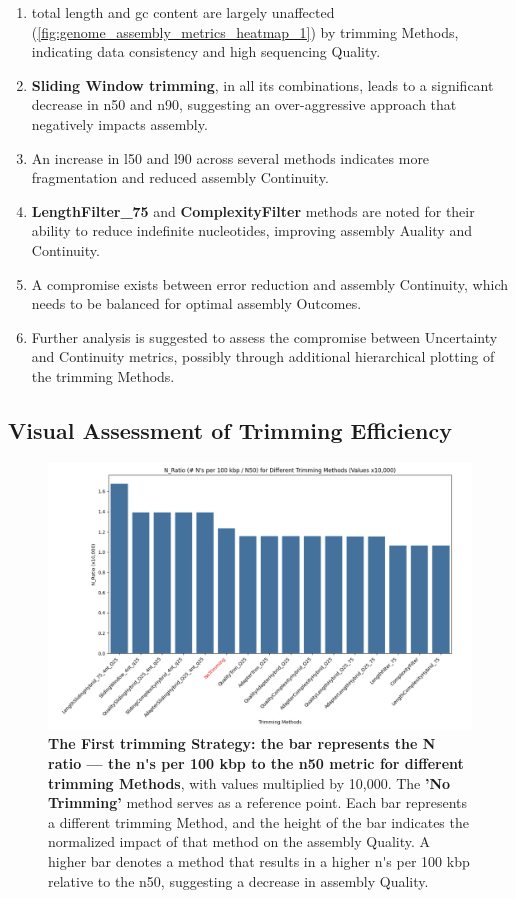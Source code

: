 \begin{enumerate}
  \item \gls{total length} and \gls{gc} content are largely unaffected (\autoref{fig:genome_assembly_metrics_heatmap_1}) by \gls{trimming} Methods, indicating data consistency and high \gls{sequencing} Quality.
  \item \textbf{Sliding Window \gls{trimming}}, in all its combinations, leads to a significant decrease in \gls{n50} and \gls{n90}, suggesting an over-aggressive approach that negatively impacts \gls{assembly}.
  \item An increase in \gls{l50} and \gls{l90} across several methods indicates more fragmentation and reduced \gls{assembly} Continuity.
  \item \textbf{LengthFilter\_75} and \textbf{ComplexityFilter} methods are noted for their ability to reduce indefinite nucleotides, improving \gls{assembly} Auality and Continuity.
  \item A compromise exists between error reduction and \gls{assembly} Continuity, which needs to be balanced for optimal \gls{assembly} Outcomes.
  \item Further analysis is suggested to assess the compromise between Uncertainty and Continuity \gls{metrics}, possibly through additional hierarchical plotting of the \gls{trimming} Methods.
\end{enumerate}

\subsection{Visual Assessment of Trimming Efficiency} 

\begin{figure}[H]
\centering
\includegraphics[width=\linewidth]{resources/images/n_ratio_1.png}
\caption{\textbf{The First \gls{trimming} Strategy: the \gls{bar} represents the N ratio — the \gls{n's per 100 kbp} to the \gls{n50} metric for different \gls{trimming} Methods}, with values multiplied by 10,000. The \textbf{'No Trimming'} method serves as a reference point. Each bar represents a different \gls{trimming} Method, and the height of the bar indicates the normalized impact of that method on the \gls{assembly} Quality. A higher bar denotes a method that results in a higher \gls{n's per 100 kbp} relative to the \gls{n50}, suggesting a decrease in \gls{assembly} Quality.}
\label{fig:n_ratio_trim_methods_1}
\end{figure}

